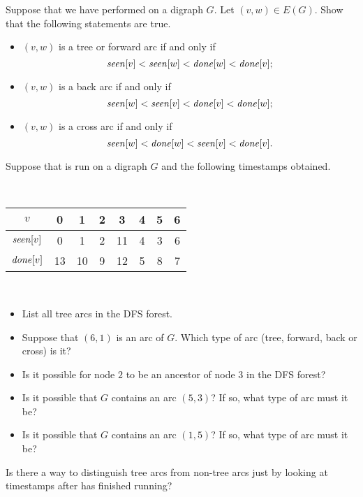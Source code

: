\begin{Exercise}
\label{ex:DFS-arc-class}
Suppose that we have performed  on a digraph $G$. Let $(v, w)\in
E(G)$. Show that the following statements are true.
\begin{itemize}
\item
$(v, w)$ is a tree or forward arc if and only if  
$$\operatorname{\text{\textit{seen}}}[v] < \operatorname{\text{\textit{seen}}}[w] < \operatorname{\text{\textit{done}}}[w] < \operatorname{\text{\textit{done}}}[v];$$
\item
$(v, w)$ is a back arc if and only if
$$\operatorname{\text{\textit{seen}}}[w] <  \operatorname{\text{\textit{seen}}}[v] < \operatorname{\text{\textit{done}}}[v] < \operatorname{\text{\textit{done}}}[w];$$ 
\item
$(v, w)$ is a cross arc if and only if 
$$\operatorname{\text{\textit{seen}}}[w] < \operatorname{\text{\textit{done}}}[w]  < \operatorname{\text{\textit{seen}}}[v] < \operatorname{\text{\textit{done}}}[v].$$
\end{itemize}
\end{Exercise}

\begin{Exercise}
\label{ex:DFS-timestamps}
\item Suppose that  is run on a digraph $G$ and the following
timestamps obtained.

\

\begin{tabular}{|c|ccccccc|}
\hline 
$v$ & 0 & 1 & 2 & 3 & 4 & 5 & 6 \\
\hline
$\operatorname{\text{\textit{seen}}}[v]$ & 0 & 1 & 2 & 11 & 4 & 3 & 6 \\
\hline
$\operatorname{\text{\textit{done}}}[v]$ & 13 & 10 & 9 & 12 & 5 & 8 & 7 \\
\hline
\end{tabular}

\

\begin{itemize}
\item 
List all tree arcs in the DFS forest.
\item 
Suppose that $(6,1)$ is an arc of $G$. Which type of arc 
(tree, forward, back or cross) is it?
\item 
Is it possible for node $2$ to be an ancestor of node $3$ in the DFS
forest?
\item
Is it possible that $G$ contains an arc $(5,3)$? If so, what type of arc
must it be?
\item 
Is it possible that $G$ contains an arc $(1,5)$? If so, what type of arc
must it be?
\end{itemize}
\end{Exercise}

\begin{Exercise}
\label{ex:DFS-tree-vs-nontree}
Is there a way to distinguish tree arcs from non-tree arcs just by
looking at timestamps after  has finished running?
\end{Exercise}

